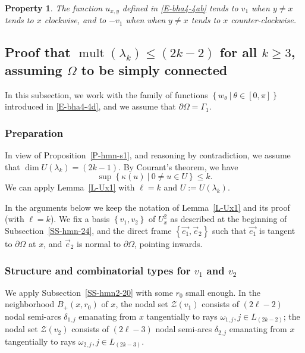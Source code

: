 \documentclass[12pt,a4paper]{amsart}
\theoremstyle{plain} %
\newtheorem{property}[theorem]{Property}
\theoremstyle{definition}
\numberwithin{equation}{section}
\numberwithin{figure}{section}
\numberwithin{table}{section}
\newcommand{\cZ}{\mathcal{Z}}
\DeclareMathOperator{\mult}{mult}
\newcommand{\set}[1]{\left\lbrace #1 \right\rbrace}
\begin{document}
{\begin{property}\label{P-hmn}
The function $u_{x,y}$ defined in \eqref{E-bha4-4ab} tends to $v_1$ when $y \neq x$ tends to $x$ clockwise,  and to $-v_1$ when when $y \neq x$ tends to $x$ counter-clockwise.
\end{property}%



\subsection{Proof that $\mult(\lambda_k) \le (2k -2)$  for all $k\ge 3$, assuming $\Omega$ to be simply connected}\label{SS-hmn-25}

In this subsection, we work with the family of functions $\set{w_{\theta} ~|~ \theta \in [0,\pi]}$ introduced in \eqref{E-bha4-4d}, and we assume that $\partial \Omega = \Gamma_1$.

\subsubsection{Preparation}\label{SSS-hmn-25A}  In view of Proposition~\ref{P-hmn-s1}, and reasoning by contradiction, we assume that $\dim U(\lambda_k) = (2k -1)$. By Courant's theorem, we have $$\sup\set{\kappa(u) ~|~ 0 \not = u \in U} \le k.$$ We can apply Lemma~\ref{L-Ux1} with $\ell = k$ and $U := U(\lambda_k)$. \smallskip


In the arguments below we keep the notation of Lemma~\ref{L-Ux1} and its proof (with $\ell = k$). We fix a basis $\set{v_1,v_2}$ of $U^2_x$ as described at the beginning of  Subsection~\ref{SS-hmn-24}, and the direct frame $\set{\vec{e_1},\vec{e}_2}$ such that $\vec{e_1}$ is tangent to $\partial \Omega$ at $x$, and $\vec{e}_2$ is normal to $\partial \Omega$, pointing inwards.


\subsubsection{Structure and combinatorial types for $v_1$ and $v_2$}\label{SSS-hmn-25B}

We apply Subsection~\ref{SS-hmn2-20} with some $r_0$ small enough. In the neighborhood $B_{+}(x,r_0)$ of $x$, the nodal set $\cZ(v_1)$ consists of $(2\ell-2)$ nodal semi-arcs $\delta_{1,j}$ emanating from $x$ tangentially to rays $\omega_{1,j}, j \in L_{(2k-2)}$; the nodal set $\cZ(v_2)$ consists of $(2\ell-3)$ nodal semi-arcs $\delta_{2,j}$ emanating from $x$ tangentially to rays $\omega_{2,j}, j \in L_{(2k-3)}$.\smallskip


}
\end{document}
